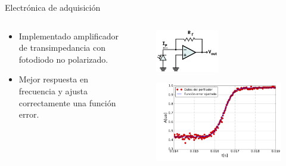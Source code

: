 
\begin{frame}{Electrónica de adquisición}
\begin{columns}[c]
    \begin{column}{0.4\textwidth}
        \begin{itemize}
        \item Implementado amplificador de transimpedancia con fotodiodo no polarizado. 
        \item Mejor respuesta en frecuencia y ajusta correctamente una función error.
        \end{itemize}
    \end{column}
    \begin{column}{0.6\textwidth}
        
        \vspace{-1em}
        \begin{figure}[H]
            \centering
            \includegraphics[width=0.5\textwidth]{fig/circuito/amp/TIA.png}
            \label{fig:circuito/amp/TIA}
        \end{figure}
        \vspace{-1em}
         \begin{figure}[H]
                \includegraphics[width=\textwidth]{fig/perfilador/fit_data_plastico_subida.png}
                \label{fig:perfilador/amplificacion_funcional}
        \end{figure}
    \end{column}
\end{columns}



\end{frame}

